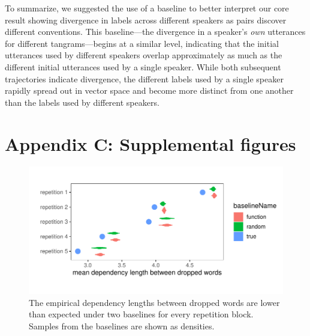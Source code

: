 \documentclass[alpha-refs]{wiley-article}
\begin{document}
To summarize, we suggested the use of a baseline to better interpret our core result showing divergence in labels across different speakers as pairs discover different conventions.
This baseline---the divergence in a speaker's \emph{own} utterances for different tangrams---begins at a similar level, indicating that the initial utterances used by different speakers overlap approximately as much as the different initial utterances used by a single speaker.
While both subsequent trajectories indicate divergence, the different labels used by a single speaker rapidly spread out in vector space and become more distinct from one another than the labels used by different speakers.

\newpage

\section*{Appendix C: Supplemental figures}


\begin{figure}[h!]
\centering
\includegraphics[scale=.8]{syntactic_reduction_baselines.pdf}
\caption{The empirical dependency lengths between dropped words are lower than expected under two baselines for every repetition block. Samples from the baselines are shown as densities. }
\label{fig:dependency_length_by_rep}
\end{figure}
\end{document}
